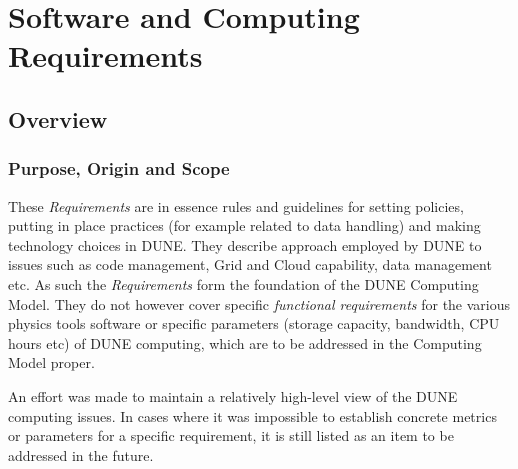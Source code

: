 \section{Software and Computing Requirements}
\subsection{Overview}
\subsubsection{Purpose, Origin and Scope}

These \textit{Requirements} are in essence rules and guidelines for setting policies,
putting in place practices (for example related to data handling) and making technology choices in DUNE.
They describe approach employed by DUNE to issues such as  code management, Grid and Cloud capability, data management etc.
As such  the \textit{Requirements} form the foundation of the DUNE Computing Model. They do not however cover specific \textit{functional requirements}
for the various physics tools software or specific parameters (storage capacity, bandwidth, CPU hours etc) of DUNE computing,
which are to be addressed in the Computing Model proper.

An effort was made to maintain a relatively high-level view of the DUNE computing issues. In cases where it was impossible to establish concrete metrics or
parameters for a specific requirement, it is still listed as an item to be addressed in the future.




